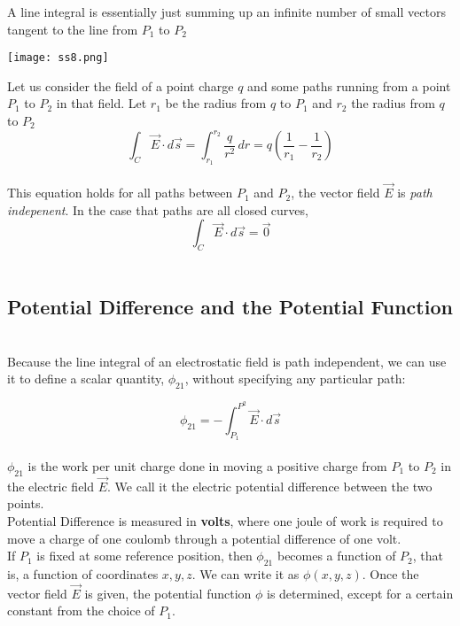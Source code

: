 \documentclass[svgnames]{article}
\begin{document}
A line integral is essentially just summing up an infinite number of small
vectors tangent to the line from $P_1$ to $P_2$ \\ 

\begin{center}
\texttt{[image: ss8.png]}
\end{center} 

Let us consider the field of a point charge $q$ and some paths running from
a point $P_1$ to $P_2$ in that field. Let $r_1$ be the radius from $q$ to $P_1$
and $r_2$ the radius from $q$ to $P_2$ \\ 

\[ \int_C \vec{E} \cdot d\vec{s} = \int_{r_1}^{r_2} \frac{q}{r^2} \, dr
= q\left(\frac{1}{r_1} - \frac{1}{r_2} \right) \] \\

This equation holds for all paths between $P_1$ and $P_2$, the vector field
$\vec{E}$ is \textit{path indepenent}. In the case that paths are all closed
curves, \\


\[ \int_C \vec{E} \cdot d\vec{s} = \vec{0} \] \\

\subsection{Potential Difference and the Potential Function} \mbox{} \\

Because the line integral of an electrostatic field is path independent, we can
use it to define a scalar quantity, $\phi_{21}$, without specifying any
particular path:

\[ \phi_{21} = -\int_{P_1}^{P^2} \vec{E} \cdot d\vec{s} \] \\

$\phi_{21}$ is the work per unit charge done in moving a positive charge from
$P_1$ to $P_2$ in the electric field $\vec{E}$. We call it the electric
potential difference between the two points. \\
Potential Difference is measured in \textbf{volts}, where one joule of work is
required to move a charge of one coulomb through a potential difference of one
volt. \\
If $P_1$ is fixed at some reference position, then $\phi_{21}$ becomes
a function of $P_2$, that is, a function of coordinates $x, y, z$. We can write
it as $\phi(x, y, z)$. Once the vector field $\vec{E}$ is given, the potential
function $\phi$ is determined, except for a certain constant from the choice of
$P_1$. \\ \\
\end{document}
